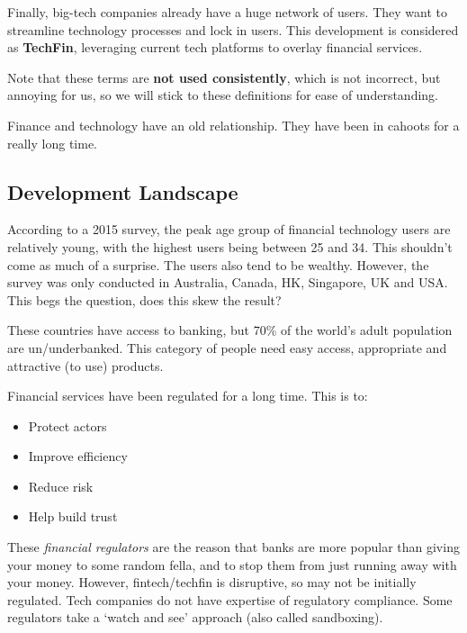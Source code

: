 \documentclass[11pt,a4paper,titlepage,dvipsnames,cmyk]{scrartcl}
\begin{document}
Finally, big-tech companies already have a huge network of users. They want to streamline technology processes and lock in users. This development is considered as \textbf{TechFin}, leveraging current tech platforms to overlay financial services.

Note that these terms are \textbf{not used consistently}, which is not incorrect, but annoying for us, so we will stick to these definitions for ease of understanding.

Finance and technology have an old relationship. They have been in cahoots for a really long time. 

\subsection{Development Landscape}
According to a 2015 survey, the peak age group of financial technology users are relatively young, with the highest users being between 25 and 34. This shouldn't come as much of a surprise. The users also tend to be wealthy. However, the survey was only conducted in Australia, Canada, HK, Singapore, UK and USA. This begs the question, does this skew the result?

These countries have access to banking, but 70\% of the world's adult population are un/underbanked. This category of people need easy access, appropriate and attractive (to use) products.

Financial services have been regulated for a long time. This is to:
\begin{itemize}
    \item Protect actors
    \item Improve efficiency
    \item Reduce risk
    \item Help build trust
\end{itemize}

These \textit{financial regulators} are the reason that banks are more popular than giving your money to some random fella, and to stop them from just running away with your money. However, fintech/techfin is disruptive, so may not be initially regulated. Tech companies do not have expertise of regulatory compliance. Some regulators take a `watch and see' approach (also called sandboxing).
\end{document}
